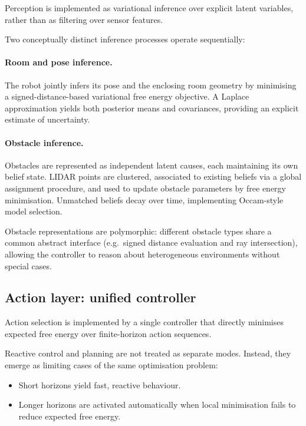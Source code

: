 \documentclass[a4paper, twoside]{article}
\begin{document}
Perception is implemented as variational inference over explicit latent variables, rather than as filtering
over sensor features.

Two conceptually distinct inference processes operate sequentially:

\paragraph{Room and pose inference.}
The robot jointly infers its pose and the enclosing room geometry by minimising a signed-distance-based
variational free energy objective. A Laplace approximation yields both posterior means and covariances,
providing an explicit estimate of uncertainty.

\paragraph{Obstacle inference.}
Obstacles are represented as independent latent causes, each maintaining its own belief state. LIDAR points
are clustered, associated to existing beliefs via a global assignment procedure, and used to update obstacle
parameters by free energy minimisation. Unmatched beliefs decay over time, implementing Occam-style model
selection.

Obstacle representations are polymorphic: different obstacle types share a common abstract interface
(e.g.\ signed distance evaluation and ray intersection), allowing the controller to reason about heterogeneous
environments without special cases.

\subsection{Action layer: unified controller}

Action selection is implemented by a single controller that directly minimises expected free energy over
finite-horizon action sequences.

Reactive control and planning are not treated as separate modes. Instead, they emerge as limiting cases of
the same optimisation problem:

\begin{itemize}
    \item Short horizons yield fast, reactive behaviour.
    \item Longer horizons are activated automatically when local minimisation fails to reduce expected
    free energy.
\end{itemize}
\end{document}
